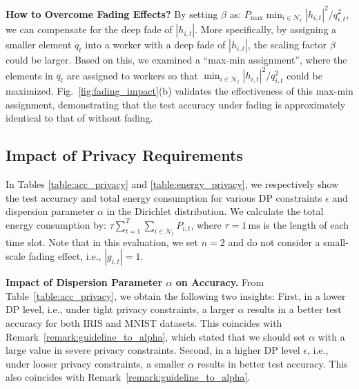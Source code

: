 \documentclass[conference,10pt]{IEEEtran}
\theoremstyle{definition}
\theoremstyle{definition}
\begin{document}
\vspace{.3em}\noindent\textbf{How to Overcome Fading Effects?}\quad
By setting $\beta$ as: $P_{\mathrm{max}}\min_{i\in \mathcal{N}_t}{|h_{i, t}|^2}/{q_{i, t}^2}$, we can compensate for the deep fade of $|h_{i, t}|$.
More specifically, by assigning a smaller element $q_t$ into a worker with a deep fade of $|h_{i, t}|$, the scaling factor $\beta$ could be larger.
Based on this, we examined a ``max-min assignment'', where the elements in $q_t$ are assigned to workers so that $\min_{i\in \mathcal{N}_t}{|h_{i, t}|^2}/{q_{i, t}^2}$ could be maximized.
Fig.~\ref{fig:fading_impact}(b) validates the effectiveness of this max-min assignment, demonstrating that the test accuracy under fading is approximately identical to that of without fading.

\subsection{Impact of Privacy Requirements}
\label{subsec:simulation_privacy_alpha}
In Tables \ref{table:acc_privacy} and \ref{table:energy_privacy}, we respectively show the test accuracy and total energy consumption for various DP constraints $\epsilon$ and dispersion parameter $\alpha$ in the Dirichlet distribution.
We calculate the total energy consumption by: $\tau\sum_{t = 1}^{T}\sum_{i\in\mathcal{N}_t} P_{i, t}$, where $\tau=1\,\mathrm{ms}$ is the length of each time slot.
Note that in this evaluation, we set $n = 2$ and do not consider a small-scale fading effect, i.e., $|g_{i, t}| = 1$.

\vspace{.3em}\noindent\textbf{Impact of Dispersion Parameter $\alpha$ on Accuracy.}\quad
From Table~\ref{table:acc_privacy}, we obtain the following two insights:
First, in a lower DP level, i.e., under tight privacy constraints, a larger $\alpha$ results in
a better test accuracy for both IRIS and MNIST datasets.
This coincides with Remark~\ref{remark:guideline_to_alpha}, which stated that we should set $\alpha$ with a large value in severe privacy constraints.
Second, in a higher DP level $\epsilon$, i.e., under looser privacy constraints, a smaller $\alpha$ results in better test accuracy.
This also coincides with Remark~\ref{remark:guideline_to_alpha}.
\end{document}
